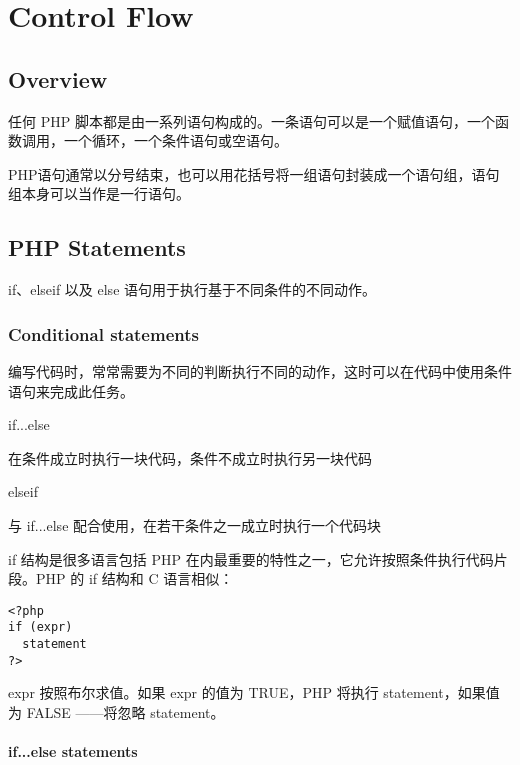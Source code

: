 \part{Control Flow}

\chapter{Overview}


任何 PHP 脚本都是由一系列语句构成的。一条语句可以是一个赋值语句，一个函数调用，一个循环，一个条件语句或空语句。


PHP语句通常以分号结束，也可以用花括号将一组语句封装成一个语句组，语句组本身可以当作是一行语句。


\chapter{PHP Statements}



if、elseif 以及 else 语句用于执行基于不同条件的不同动作。



\section{Conditional statements}

编写代码时，常常需要为不同的判断执行不同的动作，这时可以在代码中使用条件语句来完成此任务。

\begin{compactitem}
\item if...else

在条件成立时执行一块代码，条件不成立时执行另一块代码

\item elseif

与 if...else 配合使用，在若干条件之一成立时执行一个代码块
\end{compactitem}

if 结构是很多语言包括 PHP 在内最重要的特性之一，它允许按照条件执行代码片段。PHP 的 if 结构和 C 语言相似：

\begin{verbatim}
<?php
if (expr)
  statement
?>
\end{verbatim}

expr 按照布尔求值。如果 expr 的值为 TRUE，PHP 将执行 statement，如果值为 FALSE ——将忽略 statement。



\subsection{if...else statements}

